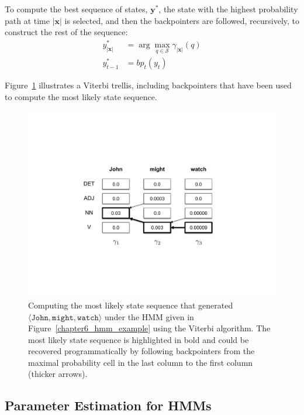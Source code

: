 \noindent To compute the best sequence of states, $\textbf{y}^*$, the
state with the highest probability path at time $|\textbf{x}|$ is
selected, and then the backpointers are followed, recursively, to
construct the rest of the sequence:
\begin{align}
y_{|\textbf{x}|}^*& = \arg \max_{q \in \mathcal{S}} \gamma_{|\textbf{x}|}(q)\\
y_{t-1}^* &= bp_t(y_t)
\end{align}

\noindent Figure~\ref{chapter6_fig_question2} illustrates a Viterbi
trellis, including backpointers that have been used to compute the
most likely state sequence.

\begin{figure}[t]
\begin{center}
\includegraphics[scale=0.55]{figures/fig-ch6-q2.pdf}
\end{center}\caption{Computing the most likely state sequence that generated $\langle \texttt{John} , \texttt{might} , \texttt{watch} \rangle$ under the HMM given in Figure~\ref{chapter6_hmm_example} using the Viterbi algorithm.  The most likely state sequence is highlighted in bold and could be recovered programmatically by following backpointers from the maximal probability cell in the last column to the first column (thicker arrows).}\label{chapter6_fig_question2}
\end{figure}


\subsection{Parameter Estimation for HMMs}
\label{chapter6_forward_backward}

